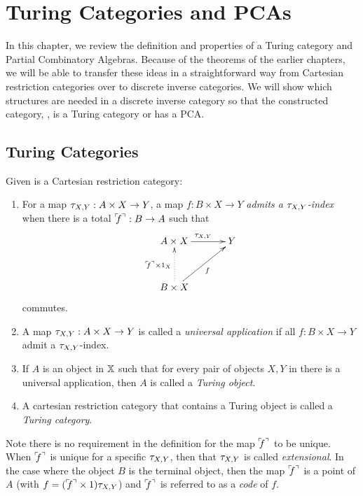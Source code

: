 \chapter{Turing Categories and PCAs} %
\label{chap:turing_categories}

In this chapter, we review the definition and properties of a Turing
category and Partial Combinatory
Algebras\cite{cockett-hostra08-intro-to-turing,cockett2010:categories-and-computability}. Because of
the theorems of the earlier chapters, we will be able to transfer these ideas in a straightforward
way from Cartesian restriction categories over to discrete inverse categories. We will show which
structures are needed in a discrete inverse category \X so that the constructed category, \Xt, is a
Turing category or has a PCA.

\section{Turing Categories}
\label{sec:turing_category_definitions}


\begin{definition}\label{def:turing_category}
  Given \X is a Cartesian restriction category:
  \begin{enumerate}
    \item For a map $\tau_{{X},{Y}}: A \times X \to Y$, a map $f:B\times X \to Y$ \emph{admits a $\tau_{{X},{Y}}$-index}
      when there is a total ${}^\ulcorner\!\!f^\urcorner:B\to A$ such that
      \[
        \xymatrix@C+10pt@R+10pt{
          A\times X \ar[r]^{\txy} & Y \\
          B\times X \ar@{.>}[u]^{\name{f}\times 1_X} \ar[ur]_f
        }
      \]
      commutes.\label{defitem:turing_admit_txy_index}
    \item A map $\tau_{{X},{Y}}: A \times X \to Y$ is called a \emph{universal application} if all
      $f:B\times X \to Y$ admit a $\tau_{{X},{Y}}$-index.\label{defitem:turing_universal_application}
    \item If $A$ is an object in $\mathbb{X}$ such that for every pair of objects $X,Y$ in \X there is
      a universal application, then $A$ is called a \emph{Turing object}.
    \item A cartesian restriction category that contains a Turing object is called a
      \emph{Turing category}.
  \end{enumerate}
\end{definition}

Note there is no requirement in the definition for the map ${}^\ulcorner\!\!f^\urcorner$ to be unique. When ${}^\ulcorner\!\!f^\urcorner$ is unique
for a specific $\tau_{{X},{Y}}$, then that $\tau_{{X},{Y}}$ is called \emph{extensional}. In the case where the object
$B$ is the terminal object, then the map ${}^\ulcorner\!\!f^\urcorner$ is a point of $A$ (with $f = ({}^\ulcorner\!\!f^\urcorner \times 1)\tau_{{X},{Y}}$) and
${}^\ulcorner\!\!f^\urcorner$ is referred to as a \emph{code} of $f$.

